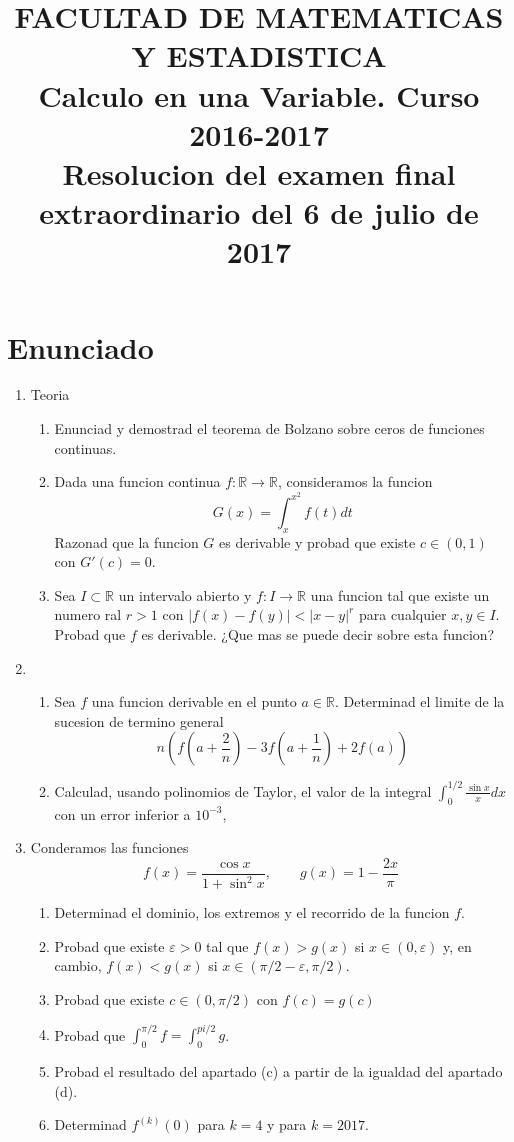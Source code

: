 \documentclass{article}
\newcommand{\abs}[1]{\left\lvert #1 \right\rvert}
\newcommand{\R}{\mathbb{R}}
\begin{document}
\title{FACULTAD DE MATEMATICAS Y ESTADISTICA \\
Calculo en una Variable. Curso 2016-2017 \\
\Large \textbf{Resolucion del examen final extraordinario del 6 de julio de 2017} }
\date{}
\maketitle

\section*{Enunciado}
\begin{enumerate}
\item Teoria
\begin{enumerate}
\item Enunciad y demostrad el teorema de Bolzano sobre ceros de funciones continuas.
\item  Dada una funcion continua $f: \mathbb{R} \longrightarrow \mathbb{R}$, consideramos
la funcion
\[
G(x) = \int_x^{x^2} f(t)dt
\]
Razonad que la funcion $G$ es derivable y probad que existe $c \in (0,1)$ con $G'(c)=0$.
\item Sea $I \subset \mathbb{R}$ un intervalo abierto y $f:I \longrightarrow \mathbb{R}$
una funcion tal que existe un numero ral $r > 1$ con $\abs{f(x) - f(y)} < \abs{x - y}^r$ para
cualquier $x, y \in I$. Probad que $f$ es derivable. ¿Que mas se puede decir sobre esta funcion?
\end{enumerate}
\item \begin{enumerate}
\item Sea $f$ una funcion derivable en el punto $a \in \R$. Determinad el limite de la sucesion
de termino general
\[
n \left( f\left( a + \frac{2}{n} \right) - 3f\left(a +\frac{1}{n} \right) + 2f(a)\right)
\]
\item Calculad, usando polinomios de Taylor, el valor de la integral
$\displaystyle \int_0^{1/2} \frac{\sin x}{x} dx$ con un error inferior a $10^{-3}$,
\end{enumerate}
\item Conderamos las funciones
\[
f(x) = \frac{\cos x}{1 + \sin^2 x}, \quad \quad g(x)=1-\frac{2x}{\pi}
\]
\begin{enumerate}
\item Determinad el dominio, los extremos y el recorrido de la funcion $f$.
\item Probad que existe $	\varepsilon > 0$ tal que $f(x) > g(x)$ si $x \in (0, \varepsilon)$ y,
en cambio, $f(x) < g(x)$ si $x \in (\pi/2-\varepsilon, \pi/2)$.
\item Probad que existe $c \in (0,\pi/2)$ con $f(c) =g(c)$
\item Probad que $\displaystyle \int_0^{\pi/2}f = \int_0^{pi/2}g$.
\item Probad el resultado del apartado (c) a partir de la igualdad del apartado (d).
\item Determinad $f^{(k)}(0)$ para $k=4$ y para $k=2017$.
\end{enumerate}
\end{enumerate}
\end{document}
